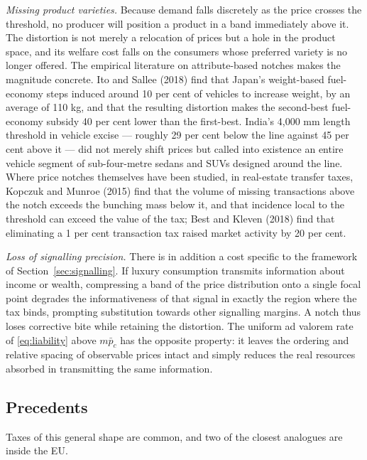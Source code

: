 \emph{Missing product varieties.} Because demand falls discretely as the price crosses the
threshold, no producer will position a product in a band immediately above it. The distortion is
not merely a relocation of prices but a hole in the product space, and its welfare cost falls on the
consumers whose preferred variety is no longer offered. The empirical literature on attribute-based
notches makes the magnitude concrete. Ito and Sallee (2018) find that Japan's weight-based
fuel-economy steps induced around 10 per cent of vehicles to increase weight, by an average of
110 kg, and that the resulting distortion makes the second-best fuel-economy subsidy 40 per cent
lower than the first-best. India's 4{,}000 mm length threshold in vehicle excise --- roughly 29 per
cent below the line against 45 per cent above it --- did not merely shift prices but called into
existence an entire vehicle segment of sub-four-metre sedans and SUVs designed around the line.
Where price notches themselves have been studied, in real-estate transfer taxes, Kopczuk and Munroe
(2015) find that the volume of missing transactions above the notch exceeds the bunching mass below
it, and that incidence local to the threshold can exceed the value of the tax; Best and Kleven
(2018) find that eliminating a 1 per cent transaction tax raised market activity by 20 per cent.

\emph{Loss of signalling precision.} There is in addition a cost specific to the framework of
Section~\ref{sec:signalling}. If luxury consumption transmits information about income or wealth,
compressing a band of the price distribution onto a single focal point degrades the informativeness
of that signal in exactly the region where the tax binds, prompting substitution towards other
signalling margins. A notch thus loses corrective bite while retaining the distortion. The uniform
ad valorem rate of \eqref{eq:liability} above $m\bar{p}_c$ has the opposite property: it leaves the
ordering and relative spacing of observable prices intact and simply reduces the real resources
absorbed in transmitting the same information.

\subsection{Precedents}
\label{sec:precedents}

Taxes of this general shape are common, and two of the closest analogues are inside the EU.

